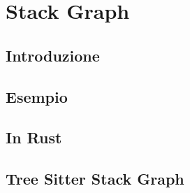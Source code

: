 \chapter{Stack Graph}

\section{Introduzione}

\section{Esempio}

\section{In Rust}

\section{Tree Sitter Stack Graph}
